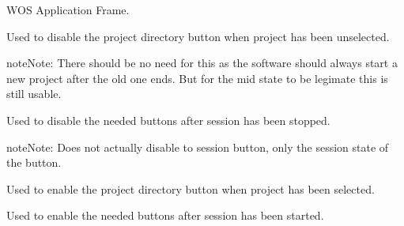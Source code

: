 \documentclass[letterpaper,10pt,english]{sphinxmanual}
\begin{document}
\begin{fulllineitems}
\label{diwacs:diwacs.GraphicalUserInterface}
WOS Application Frame.

\begin{fulllineitems}
\label{diwacs:diwacs.GraphicalUserInterface.DisableDirectoryButton}
Used to disable the project directory button when project has been
unselected.

\begin{notice}{note}{Note:}
There should be no need for this as the software should
always start a new project after the old one ends.
But for the mid state to be legimate this is still
usable.
\end{notice}

\end{fulllineitems}


\begin{fulllineitems}
\label{diwacs:diwacs.GraphicalUserInterface.DisableSessionButton}
Used to disable the needed buttons after session has been stopped.

\begin{notice}{note}{Note:}
Does not actually disable to session button, only the session
state of the button.
\end{notice}

\end{fulllineitems}


\begin{fulllineitems}
\label{diwacs:diwacs.GraphicalUserInterface.EnableDirectoryButton}
Used to enable the project directory button when project has been
selected.

\end{fulllineitems}


\begin{fulllineitems}
\label{diwacs:diwacs.GraphicalUserInterface.EnableSessionButton}
Used to enable the needed buttons after session has been started.


\end{fulllineitems}
\end{fulllineitems}
\end{document}
